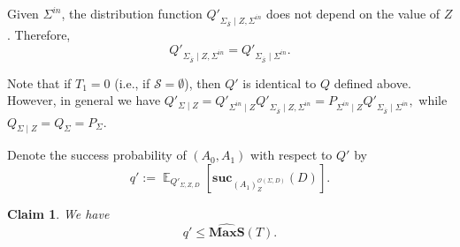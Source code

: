 \documentclass[11pt]{article}
\newtheorem{claim}[theorem]{Claim}
\DeclareMathOperator*{\E}{\mathbb{E}}
\newcommand{\SECV}{{D}}
\newcommand{\SUC}{\boldsymbol{suc}}
\newcommand{\MAXS}{\boldsymbol{MaxS}}
\begin{document}
Given $\Sigma^{in}$, the distribution function $Q'_{\Sigma_{\overline{\mathcal{S}}} \mid Z, \Sigma^{in} }$ does not depend on the value of $Z$.
Therefore,
$$Q'_{\Sigma_{\overline{\mathcal{S}}} \mid Z, \Sigma^{in} } = Q'_{\Sigma_{\overline{\mathcal{S}}} \mid \Sigma^{in} }.$$


Note that if $T_1 = 0$ (i.e., if $\mathcal{S} = \emptyset$), then $Q'$ is identical to $Q$ defined above. However, in general we have
$
Q'_{\Sigma \mid Z} = 
Q'_{\Sigma^{in} \mid Z} 
Q'_{\Sigma_{\overline{\mathcal{S} }} \mid Z, \Sigma^{in} } =
P_{\Sigma^{in} \mid Z}
Q'_{\Sigma_{\overline{\mathcal{S} }} \mid \Sigma^{in}},
$
while
$Q_{\Sigma \mid Z} = 
Q_{\Sigma} =
P_{\Sigma}$.

Denote the success probability of $(A_0,A_1)$ with respect to $Q'$ by
$$
q' := \E_{Q'_{\Sigma,Z,\SECV}}
[ \SUC_{(A_1)_{Z}^{\mathcal{O}(\Sigma,\SECV)}}(\SECV) ].
$$


\begin{claim} We have
\label{clm:basic with advice}
$$
q' 
\leq 
\widehat{\MAXS}(T).$$
\end{claim}
\end{document}
